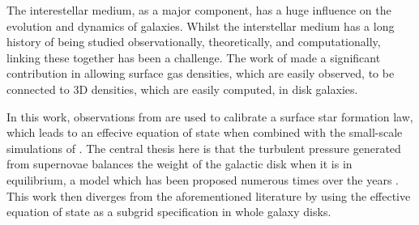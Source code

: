 The interestellar medium, as a major component, has a huge influence on the evolution and dynamics of galaxies.
Whilst the interstellar medium has a long history of being studied observationally, theoretically, and computationally, linking these together has been a challenge.
The work of \citet{schaye2004} made a significant contribution in allowing surface gas densities, which are easily observed, to be connected to 3D densities, which are easily computed, in disk galaxies.

In this work, observations from \citet{bigiel2008} are used to calibrate a surface star formation law, which leads to an effecive equation of state when combined with the small-scale simulations of \citet{martizzi2015}.
The central thesis here is that the turbulent pressure generated from supernovae balances the weight of the galactic disk when it is in equilibrium, a model which has been proposed numerous times over the years \citep{silk1997, ostriker2011, faucher-giguere2013, martizzi2016}.
This work then diverges from the aforementioned literature by using the effective equation of state as a subgrid specification in whole galaxy disks.
